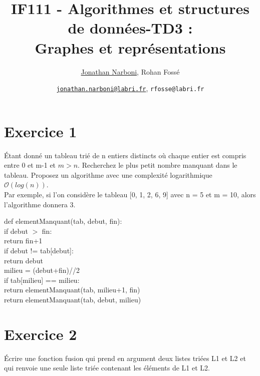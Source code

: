 \documentclass[10pt,a4paper]{article}
\title{IF111 - Algorithmes et structures de données-TD3 :\\ Graphes et représentations}
\date{}
\author{\underline{Jonathan Narboni}, Rohan Fossé}
\date{\underline{\texttt{jonathan.narboni@labri.fr}}, \texttt{rfosse@labri.fr}}
\begin{document}
\maketitle

\section*{Exercice 1}
Étant donné un tableau trié de n entiers distincts où chaque entier est compris entre 0 et m-1 et $m>n$. Recherchez le plus petit nombre manquant dans le tableau. Proposez un algorithme avec une complexité logarithmique $\mathcal{O}(log(n))$.\\
Par exemple, si l'on considère le tableau [0, 1, 2, 6, 9] avec n = 5 et m = 10, alors l'algorithme donnera 3.

\begin{tcolorbox}
def elementManquant(tab, debut, fin):\\
    if debut $>$ fin: \\
        return fin+1\\
     
    if debut != tab[debut]: \\
        return debut\\
 
    milieu = (debut+fin)//2\\
    if tab[milieu] == milieu:\\
        return elementManquant(tab, milieu+1, fin) \\
     
    return elementManquant(tab, debut, milieu)\\
\end{tcolorbox}

\section*{Exercice 2}
Écrire une fonction fusion qui prend en argument deux listes triées L1 et L2 et qui renvoie une seule liste triée contenant les éléments de L1 et L2.
\end{document}
